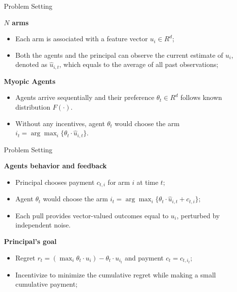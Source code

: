 \documentclass[serif]{beamer}
\begin{document}
\begin{frame}{Problem Setting}

\textbf{$N$ arms}
\begin{itemize}[label=\textbullet]
\item Each arm is associated with a feature vector $u_i\in R^{d}$;
\item Both the agents and the principal can observe the current estimate of $u_i$, denoted as $\hat{u}_{i,t}$, which equals to the average of all past observations;
\end{itemize}
\vspace{1cm}
\textbf{Myopic Agents}
\begin{itemize}[label=\textbullet]
\item Agents arrive sequentially and their preference $\theta_t\in R^{d}$ follows known distribution $F(\cdot)$.
\item Without any incentives, agent $\theta_t$ would choose the arm $i_t = \arg\max_{i}\{\theta_{t}\cdot \hat{u}_{i,t}\}$.
\end{itemize}

\end{frame}

\begin{frame}{Problem Setting}

\textbf{Agents behavior and feedback}
\begin{itemize}[label=\textbullet]
\item Principal chooses payment $c_{t,i}$ for arm $i$ at time $t$;
\item Agent $\theta_t$ would choose the arm $i_t = \arg\max_{i}\{\theta_{t}\cdot \hat{u}_{i,t}+c_{t,i}\}$;
\item Each pull provides vector-valued outcomes equal to $u_{i}$, perturbed by independent noise.
\end{itemize}
\vspace{1cm}
\textbf{Principal's goal}
\begin{itemize}[label=\textbullet]
\item Regret $r_t = (\max_{i} \theta_t \cdot u_i) - \theta_t \cdot u_{i_t}$ and payment $c_t = c_{t,i_t}$;
\item Incentivize to minimize the cumulative regret while making a small cumulative payment;
\end{itemize}

\end{frame}
\end{document}
